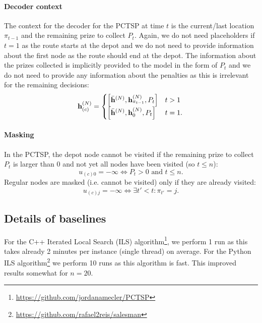 \paragraph{Decoder context}
The context for the decoder for the PCTSP at time $t$ is the current/last location $\pi_{t-1}$ and the remaining prize to collect $P_t$. Again, we do not need placeholders if $t=1$ as the route starts at the depot and we do not need to provide information about the first node as the route should end at the depot. The information about the prizes collected is implicitly provided to the model in the form of $P_t$ and we do not need to provide any information about the penalties as this is irrelevant for the remaining decisions:
\begin{equation}
	\mathbf{h}_{(c)}^{(N)} = \begin{cases}
		\left[\bar{\mathbf{h}}^{(N)} , \mathbf{h}^{(N)}_{\pi_{t-1}} , P_t  \right] & t > 1 \\
        \left[\bar{\mathbf{h}}^{(N)} , \mathbf{h}^{(N)}_0 , P_t \right] & t = 1.
\end{cases} \\
\end{equation}

\paragraph{Masking}
In the PCTSP, the depot node cannot be visited if the remaining prize to collect $P_t$ is larger than 0 and not yet all nodes have been visited (so $t \le n$): 
\begin{equation}
    u_{(c)0} = - \infty \Leftrightarrow P_t > 0 \text{ and } t \le n.
\end{equation}
Regular nodes are masked (i.e. cannot be visited) only if they are already visited:
\begin{equation}
    u_{(c)j} = - \infty \Leftrightarrow \exists t' < t: \pi_{t'} = j.
\end{equation}

\subsection{Details of baselines}

For the C++ Iterated Local Search (ILS) algorithm\footnote{\url{https://github.com/jordanamecler/PCTSP}}, we perform 1 run as this takes already 2 minutes per instance (single thread) on average. For the Python ILS algorithm\footnote{\url{https://github.com/rafael2reis/salesman}} we perform 10 runs as this algorithm is fast. This improved results somewhat for $n = 20$.

